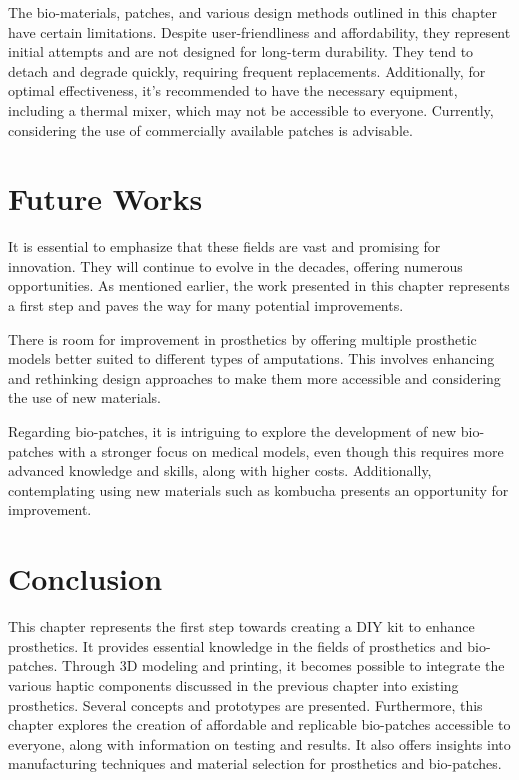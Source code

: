 The bio-materials, patches, and various design methods outlined in this chapter have certain limitations. Despite user-friendliness and affordability, they represent initial attempts and are not designed for long-term durability. They tend to detach and degrade quickly, requiring frequent replacements. Additionally, for optimal effectiveness, it's recommended to have the necessary equipment, including a thermal mixer, which may not be accessible to everyone. Currently, considering the use of commercially available patches is advisable.

\section{Future Works}
It is essential to emphasize that these fields are vast and promising for innovation. They will continue to evolve in the decades, offering numerous opportunities. As mentioned earlier, the work presented in this chapter represents a first step and paves the way for many potential improvements.

There is room for improvement in prosthetics by offering multiple prosthetic models better suited to different types of amputations. This involves enhancing and rethinking design approaches to make them more accessible and considering the use of new materials.

Regarding bio-patches, it is intriguing to explore the development of new bio-patches with a stronger focus on medical models, even though this requires more advanced knowledge and skills, along with higher costs. Additionally, contemplating using new materials such as kombucha presents an opportunity for improvement.

\section{Conclusion}
This chapter represents the first step towards creating a DIY kit to enhance prosthetics. It provides essential knowledge in the fields of prosthetics and bio-patches. Through 3D modeling and printing, it becomes possible to integrate the various haptic components discussed in the previous chapter into existing prosthetics. Several concepts and prototypes are presented. Furthermore, this chapter explores the creation of affordable and replicable bio-patches accessible to everyone, along with information on testing and results. It also offers insights into manufacturing techniques and material selection for prosthetics and bio-patches.